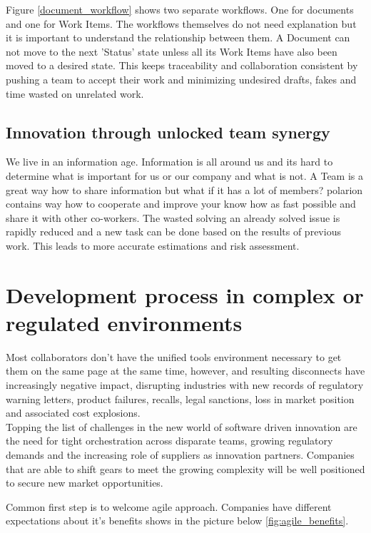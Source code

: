 \documentclass[thesis=M,english]{FITthesis}[2012/06/26]
\begin{document}
Figure \ref{document_workflow} shows two separate workflows. One for documents and one for Work Items. The workflows themselves do not need explanation but it is important to understand the relationship between them. A Document can not move to the next 'Status' state unless all its Work Items have also been moved to a desired state. This keeps traceability and collaboration consistent by pushing a team to accept their work and minimizing undesired drafts, fakes and time wasted on unrelated work. 

\subsection{Innovation through unlocked team synergy}

We live in an information age. Information is all around us and its hard to determine what is important for us or our company and what is not. A Team is a great way how to share information but what if it has a lot of members? \acrshort{polarion} contains way how to cooperate and improve your know how as fast possible and share it with other co-workers. The wasted solving an already solved issue is rapidly reduced and a new task can be done based on the results of previous work. This  leads to more accurate estimations and risk assessment.

\section{Development process in complex or regulated environments}

Most collaborators don’t have the unified tools environment necessary to get them on the same page at the same time, however, and resulting disconnects have increasingly negative impact, disrupting industries with new records of regulatory warning letters, product failures, recalls, legal sanctions, loss in market position and associated cost explosions.\\

Topping the list of challenges in the new world of software driven innovation are the need for tight orchestration across disparate teams, growing regulatory demands and the increasing role of suppliers as innovation partners. Companies that are able to shift gears to meet the growing complexity will be well positioned to secure new market opportunities.

Common first step is to welcome agile approach. Companies have different expectations about it's benefits shows in the picture below \ref{fig:agile_benefits}.
\end{document}
